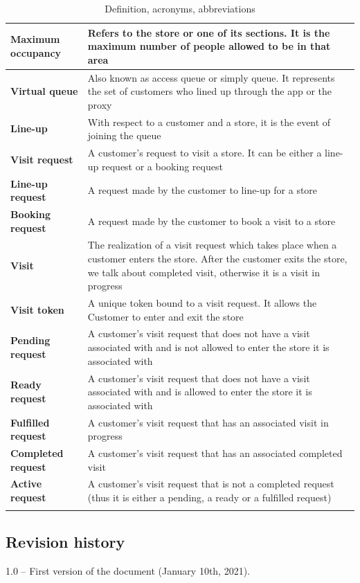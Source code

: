 \documentclass[a4paper,oneside,11pt]{book}
\begin{document}
\begin{longtable}[c] { |>{\bfseries{}}C{0.25\textwidth}|H{0.55\textwidth}| }
        Maximum occupancy & Refers to the store or one of its sections. It is the maximum number of people allowed to be in that area \\ \hline
        Virtual queue & Also known as access queue or simply queue. It represents the set of customers who lined up through the app or the proxy \\ \hline
        Line-up & With respect to a customer and a store, it is the event of joining the queue \\ \hline
        Visit request & A customer’s request to visit a store. It can be either a line-up request or a booking request \\ \hline
        Line-up request & A request made by the customer to line-up for a store \\ \hline
        Booking request & A request made by the customer to book a visit to a store \\ \hline
        Visit & The realization of a visit request which takes place when a customer enters the store. After the customer exits the store, we talk about completed visit, otherwise it is a visit in progress  \\ \hline
        Visit token & A unique token bound to a visit request. It allows the Customer to enter and exit the store \\ \hline
        Pending request & A customer’s visit request that does not have a visit associated with and is not allowed to enter the store it is associated with \\ \hline
        Ready request & A customer’s visit request that does not have a visit associated with and is allowed to enter the store it is associated with \\ \hline
        Fulfilled request & A customer’s visit request that has an associated visit in progress \\ \hline
        Completed request & A customer’s visit request that has an associated completed visit \\ \hline
        Active request & A customer’s visit request that is not a completed request (thus it is either a pending, a ready or a fulfilled request) \\
        \hline
    \caption{Definition, acronyms, abbreviations}
    \label{table:definitions_acronyms_abbreviations}
    \end{longtable}

    \subsection{Revision history}
    1.0 -- First version of the document (January 10th, 2021).
    
\end{document}
